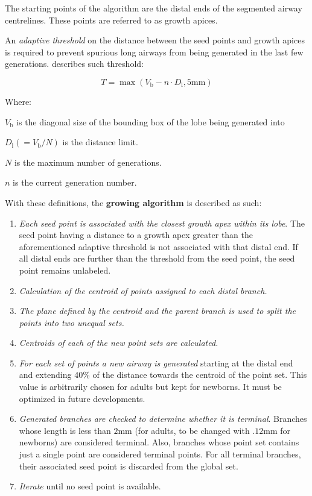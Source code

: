 The starting points of the algorithm are the distal ends of the
segmented airway centrelines.  These points are referred to as growth
apices.

An \emph{adaptive threshold} on the distance between the seed points
and growth apices is required to prevent spurious long airways from being
generated in the last few generations.  
describes such threshold:

\begin{equation}
  T = \max(V_{\text{b}} - n\cdot D_{\text{l}}, 5\text{mm})
  \label{eq:airway_threshold}
\end{equation}

Where:
\begin{description}
\item $V_{\text{b}}$ is the diagonal size of the bounding box of the lobe being
  generated into
\item $D_{\text{l}} (= {V_{\text{b}}/{N}})$ is the distance limit.
\item $N$ is the maximum number of generations.
\item $n$ is the current generation number.
\end{description}

With these definitions, the \textbf{growing algorithm} is described as
such:

\begin{enumerate}
\item \emph{Each seed point is associated with the closest growth apex
    within its lobe}.  The seed point having a distance to a
  growth apex greater than the aforementioned adaptive threshold is
  not associated with that distal end.  If all distal ends are further
  than the threshold from the seed point, the seed point remains
  unlabeled.
\item \emph{Calculation of the centroid of points assigned to each
    distal branch.}
\item \emph{The plane defined by the centroid and the parent branch is
    used to split the points into two unequal sets.}
\item \emph{Centroids of each of the new point sets are calculated.}
\item \emph{For each set of points a new airway is generated} starting
  at the distal end and extending 40\% of the distance towards the
  centroid of the point set.  This value is arbitrarily chosen for adults but kept for
  newborns.  It must be optimized in future developments.
\item \emph{Generated branches are checked to determine whether it is
    terminal}.  Branches whose length is less than $2\text{mm}$ (for
  adults, to be changed with $.12\text{mm}$ for newborns) are
  considered terminal.  Also, branches whose point set contains just a
  single point are considered terminal points.  For all
  terminal branches, their associated seed point is discarded from the
  global set.
\item \emph{Iterate} until no seed point is available.
\end{enumerate}

